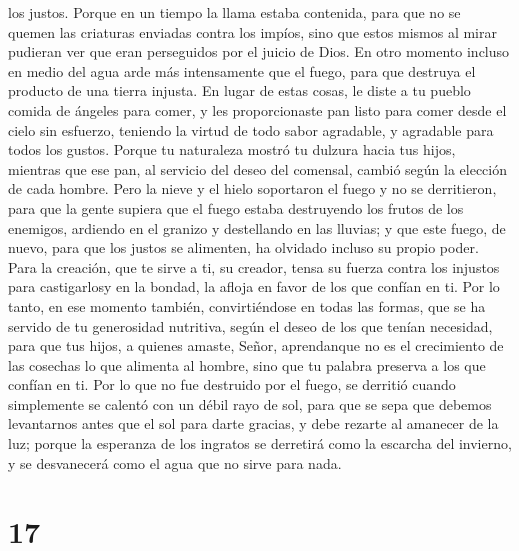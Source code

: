 los justos.  Porque en un tiempo la llama estaba
contenida, para que no se quemen las criaturas enviadas contra los
impíos, sino que estos mismos al mirar pudieran ver que eran perseguidos
por el juicio de Dios.  En otro momento incluso en medio
del agua arde más intensamente que el fuego, para que destruya el
producto de una tierra injusta.  En lugar de estas cosas,
le diste a tu pueblo comida de ángeles para comer, y les proporcionaste
pan listo para comer desde el cielo sin esfuerzo, teniendo la virtud de
todo sabor agradable, y agradable para todos los gustos. 
Porque tu naturaleza mostró tu dulzura hacia tus hijos, mientras que ese
pan, al servicio del deseo del comensal, cambió según la elección de
cada hombre.  Pero la nieve y el hielo soportaron el
fuego y no se derritieron, para que la gente supiera que el fuego estaba
destruyendo los frutos de los enemigos, ardiendo en el granizo y
destellando en las lluvias;  y que este fuego, de nuevo,
para que los justos se alimenten, ha olvidado incluso su propio poder.
 Para la creación, que te sirve a ti, su creador, tensa
su fuerza contra los injustos para castigarlosy en la bondad, la afloja
en favor de los que confían en ti.  Por lo tanto, en ese
momento también, convirtiéndose en todas las formas, que se ha servido
de tu generosidad nutritiva, según el deseo de los que tenían necesidad,
 para que tus hijos, a quienes amaste, Señor, aprendanque
no es el crecimiento de las cosechas lo que alimenta al hombre, sino que
tu palabra preserva a los que confían en ti.  Por lo que
no fue destruido por el fuego, se derritió cuando simplemente se calentó
con un débil rayo de sol,  para que se sepa que debemos
levantarnos antes que el sol para darte gracias, y debe rezarte al
amanecer de la luz;  porque la esperanza de los ingratos
se derretirá como la escarcha del invierno, y se desvanecerá como el
agua que no sirve para nada.

\hypertarget{section-16}{%
\section{17}\label{section-16}}

